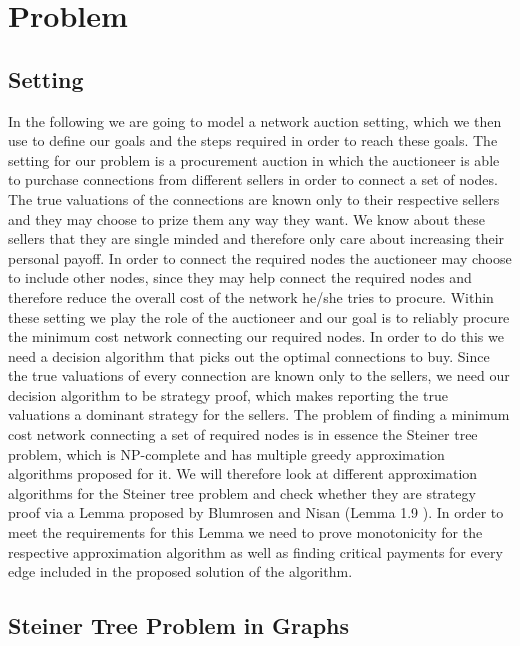
\chapter{Problem}\label{chapter:problem}

\section{Setting}

In the following we are going to model a network auction setting, which we then use to define our goals and the steps required in order to reach these goals. The setting for our problem is a procurement auction in which the auctioneer is able to purchase connections from different sellers in order to connect a set of nodes. The true valuations of the connections are known only to their respective sellers and they may choose to prize them any way they want. We know about these sellers that they are single minded and therefore only care about increasing their personal payoff. In order to connect the required nodes the auctioneer may choose to include other nodes, since they may help connect the required nodes and therefore reduce the overall cost of the network he/she tries to procure. Within these setting we play the role of the auctioneer and our goal is to reliably procure the minimum cost network connecting our required nodes. In order to do this we need a decision algorithm that picks out the optimal connections to buy. Since the true valuations of every connection are known only to the sellers, we need our decision algorithm to be strategy proof, which makes reporting the true valuations a dominant strategy for the sellers. The problem of finding a minimum cost network connecting a set of required nodes is in essence the Steiner tree problem, which is NP-complete and has multiple greedy approximation algorithms proposed for it. We will therefore look at different approximation algorithms for the Steiner tree problem and check whether they are strategy proof via a Lemma proposed by Blumrosen and Nisan (Lemma 1.9 \cite{BlNi07}). In order to meet the requirements for this Lemma we need to prove monotonicity for the respective approximation algorithm as well as finding critical payments for every edge included in the proposed solution of the algorithm.

\section{Steiner Tree Problem in Graphs}

